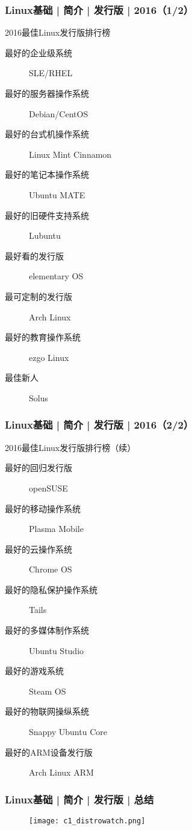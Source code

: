 \begin{frame}
  \frametitle{Linux基础 | 简介 | 发行版 | 2016（1/2）}
  \begin{block}{2016最佳Linux发行版排行榜}
  \begin{description}
    \item[最好的企业级系统] SLE/RHEL
    \item[最好的服务器操作系统] Debian/CentOS
    \item[最好的台式机操作系统] Linux Mint Cinnamon
    \item[最好的笔记本操作系统] Ubuntu MATE
    \item[最好的旧硬件支持系统] Lubuntu
    \item[最好看的发行版] elementary OS
    \item[最可定制的发行版] Arch Linux
    \item[最好的教育操作系统] ezgo Linux
    \item[最佳新人] Solus
  \end{description}
  \end{block}
\end{frame}

\begin{frame}
  \frametitle{Linux基础 | 简介 | 发行版 | 2016（2/2）}
  \begin{block}{2016最佳Linux发行版排行榜（续）}
  \begin{description}
    \item[最好的回归发行版] openSUSE
    \item[最好的移动操作系统] Plasma Mobile
    \item[最好的云操作系统] Chrome OS
    \item[最好的隐私保护操作系统] Tails
    \item[最好的多媒体制作系统] Ubuntu Studio
    \item[最好的游戏系统] Steam OS
    \item[最好的物联网操纵系统] Snappy Ubuntu Core
    \item[最好的ARM设备发行版] Arch Linux ARM
  \end{description}
  \end{block}
\end{frame}

\begin{frame}
  \frametitle{Linux基础 | 简介 | 发行版 | 总结}
  \begin{figure}
    \centering
    \texttt{[image: c1\_distrowatch.png]}
  \end{figure}
\end{frame}

